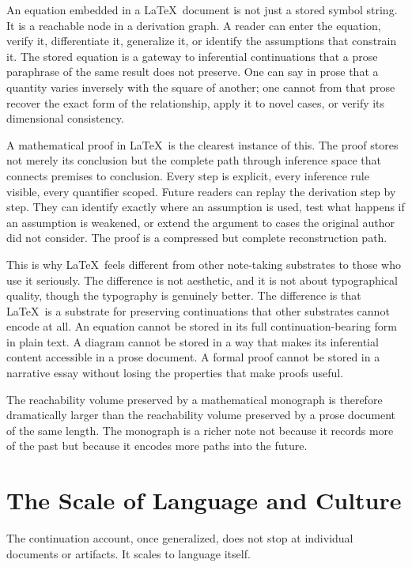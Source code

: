 \documentclass[12pt, a4paper]{article}
\begin{document}
An equation embedded in a \LaTeX\ document is not just a stored symbol string. It
is a reachable node in a derivation graph. A reader can enter the equation, verify
it, differentiate it, generalize it, or identify the assumptions that constrain
it. The stored equation is a gateway to inferential continuations that a prose
paraphrase of the same result does not preserve. One can say in prose that a
quantity varies inversely with the square of another; one cannot from that prose
recover the exact form of the relationship, apply it to novel cases, or verify its
dimensional consistency.

A mathematical proof in \LaTeX\ is the clearest instance of this. The proof stores
not merely its conclusion but the complete path through inference space that
connects premises to conclusion. Every step is explicit, every inference rule
visible, every quantifier scoped. Future readers can replay the derivation
step by step. They can identify exactly where an assumption is used, test what
happens if an assumption is weakened, or extend the argument to cases the original
author did not consider. The proof is a compressed but complete reconstruction
path.

This is why \LaTeX\ feels different from other note-taking substrates to those who
use it seriously. The difference is not aesthetic, and it is not about
typographical quality, though the typography is genuinely better. The difference
is that \LaTeX\ is a substrate for preserving continuations that other substrates
cannot encode at all. An equation cannot be stored in its full continuation-bearing
form in plain text. A diagram cannot be stored in a way that makes its inferential
content accessible in a prose document. A formal proof cannot be stored in a
narrative essay without losing the properties that make proofs useful.

The reachability volume preserved by a mathematical monograph is therefore
dramatically larger than the reachability volume preserved by a prose document of
the same length. The monograph is a richer note not because it records more of the
past but because it encodes more paths into the future.

\section{The Scale of Language and Culture}

The continuation account, once generalized, does not stop at individual documents
or artifacts. It scales to language itself.
\end{document}
